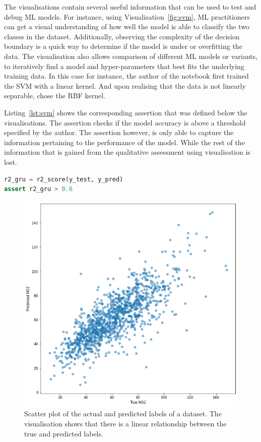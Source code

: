 The visualisations contain several useful information that can be used to test and debug ML models. For instance, using Visualisation~\ref{fig:svm}, ML practitioners can get a visual understanding of how well the model is able to classify the two classes in the dataset. Additionally, observing the complexity of the decision boundary is a quick way to determine if the model is under or overfitting the data. The visualisation also allows comparison of different ML models or variants, to iteratively find a model and hyper-parameters that best fits the underlying training data. In this case for instance, the author of the notebook first trained the SVM with a linear kernel. And upon realising that the data is not linearly separable, chose the RBF kernel.

Listing~\ref{lst:svm} shows the corresponding assertion that was defined below the visualisations. The assertion checks if the model accuracy is above a threshold specified by the author. The assertion however, is only able to capture the information pertaining to the performance of the model. While the rest of the information that is gained from the qualitative assessment using visualisation is lost.

\begin{lstlisting}[language=Python, caption={Assertion to check that the Coefficient of Determination ($R^2$) is higher than the specified threshold.}, label={lst:r2}]
r2_gru = r2_score(y_test, y_pred)
assert r2_gru > 0.6
\end{lstlisting}

\begin{figure}
  \includegraphics[width=\linewidth]{../catalogue/select-332a.png}
  \caption{Scatter plot of the actual and predicted labels of a dataset. The visualisation shows that there is a linear relationship between the true and predicted labels.}\label{fig:r2}
\end{figure}

